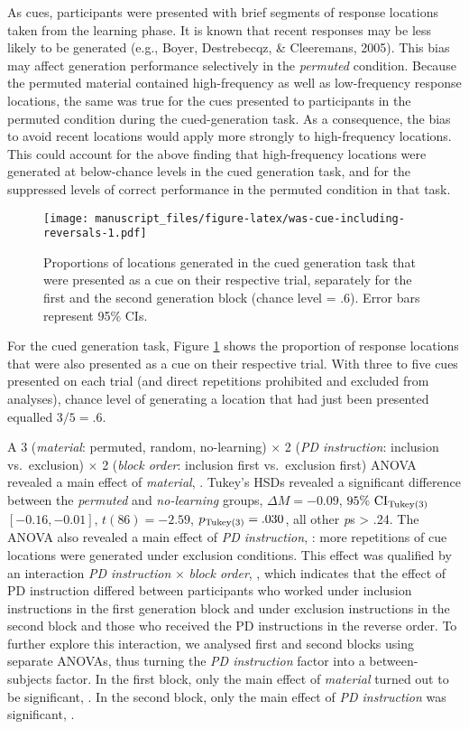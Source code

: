 \documentclass[
  english,
  man]{apa6}
\begin{document}
As cues, participants were presented with brief segments of response locations taken from the learning phase.
It is known that recent responses may be less likely to be generated (e.g., Boyer, Destrebecqz, \& Cleeremans, 2005).
This bias may affect generation performance selectively in the \emph{permuted} condition.
Because the permuted material contained high-frequency as well as low-frequency response locations, the same was true for the cues presented to participants in the permuted condition during the cued-generation task.
As a consequence, the bias to avoid recent locations would apply more strongly to high-frequency locations.
This could account for the above finding that high-frequency locations were generated at below-chance levels in the cued generation task, and for the suppressed levels of correct performance in the permuted condition in that task.



\begin{figure}
\centering
\texttt{[image: manuscript\_files/figure-latex/was-cue-including-reversals-1.pdf]}
\caption{\label{fig:was-cue-including-reversals}Proportions of locations generated in the cued generation task that were presented as a cue on their respective trial, separately for the first and the second generation block (chance level = .6). Error bars represent 95\% CIs.}
\end{figure}

For the cued generation task, Figure \ref{fig:was-cue-including-reversals} shows the proportion of response locations that were also presented as a cue on their respective trial.
With three to five cues presented on each trial (and direct repetitions prohibited and excluded from analyses),
chance level of generating a location that had just been presented equalled \(3/5 = .6\).

A 3 (\emph{material}: permuted, random, no-learning) \(\times\) 2 (\emph{PD instruction}: inclusion vs.~exclusion) \(\times\) 2 (\emph{block order}: inclusion first vs.~exclusion first) ANOVA revealed a main effect of \emph{material}, .
Tukey's HSDs revealed a significant difference between the \emph{permuted} and \emph{no-learning} groups, \(\Delta M = -0.09\), \(95\%\ \mathrm{CI}_\mathrm{\scriptsize Tukey(3)}\) \([-0.16, -0.01]\), \(t(86) = -2.59\), \(p_\mathrm{\scriptsize Tukey(3)} = .030\), all other \emph{p}s \textgreater{} .24.
The ANOVA also revealed a main effect of \emph{PD instruction}, : more repetitions of cue locations were generated under exclusion conditions.
This effect was qualified by an interaction \emph{PD instruction} \(\times\) \emph{block order}, , which indicates that the effect of PD instruction differed between participants who worked under inclusion instructions in the first generation block and under exclusion instructions in the second block and those who received the PD instructions in the reverse order. To further explore this interaction, we analysed first and second blocks using separate ANOVAs, thus turning the \emph{PD instruction} factor into a between-subjects factor.
In the first block, only the main effect of \emph{material} turned out to be significant, .
In the second block, only the main effect of \emph{PD instruction} was significant, .
\end{document}
